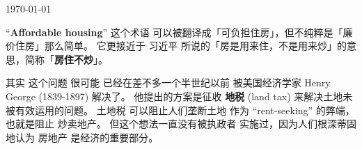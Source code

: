 \begin{preview}

\title{\vspace{-1.5cm} \bfseries{}}

\date{}

\maketitle

\vspace{-4.5cm}
\hfill{\tiny\today}
\vspace*{1.5cm}

\setcounter{section}{-1}
\setcounter{mypage}{0}


\begin{minipage}{\textwidth}
\setlength{\parskip}{0.4\baselineskip}

``\textbf{Affordable housing}'' 这个术语 可以被翻译成「可负担住房」，但不纯粹是「廉价住房」那么简单。 它更接近于 习近平 所说的「房是用来住，不是用来炒」的意思，简称「\textbf{房住不炒}」。

其实 这个问题 很可能 已经在差不多一个半世纪以前 被美国经济学家 Henry George (1839-1897) 解决了。 他提出的方案是征收 \textbf{地税} (land tax) 来解决土地未被有效运用的问题。 土地税 可以阻止人们垄断土地 作为 “rent-seeking” 的弊端，也就是阻止 炒卖地产。 但这个想法一直没有被执政者 实施过，因为人们根深蒂固地认为 房地产 是经济的重要部分。

\end{minipage}
\end{preview}

